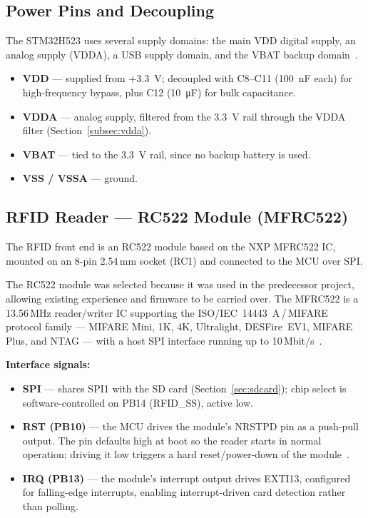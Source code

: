 \subsection{Power Pins and Decoupling}
\label{subsec:mcu-power}

The STM32H523 uses several supply domains: the main VDD digital supply, an analog supply
(VDDA), a USB supply domain, and the VBAT backup domain~\cite{ref1}.

\begin{itemize}
  \item \textbf{VDD} --- supplied from +\SI{3.3}{\volt}; decoupled with C8--C11
        (\SI{100}{\nano\farad} each) for high-frequency bypass, plus C12
        (\SI{10}{\micro\farad}) for bulk capacitance.
  \item \textbf{VDDA} --- analog supply, filtered from the \SI{3.3}{\volt} rail through
        the VDDA filter (Section~\ref{subsec:vdda}).
  \item \textbf{VBAT} --- tied to the \SI{3.3}{\volt} rail, since no backup battery is
        used.
  \item \textbf{VSS / VSSA} --- ground.
\end{itemize}

\subsection{RFID Reader --- RC522 Module (MFRC522)}
\label{subsec:rfid}

The RFID front end is an RC522 module based on the NXP MFRC522 IC, mounted on an 8-pin
2.54\,mm socket (RC1) and connected to the MCU over SPI.

The RC522 module was selected because it was used in the predecessor project, allowing
existing experience and firmware to be carried over. The MFRC522 is a 13.56\,MHz
reader/writer IC supporting the ISO/IEC~14443~A\,/\,MIFARE protocol family --- MIFARE
Mini, 1K, 4K, Ultralight, DESFire~EV1, MIFARE Plus, and NTAG --- with a host SPI
interface running up to 10\,Mbit/s~\cite{ref3}.

\textbf{Interface signals:}
\begin{itemize}
  \item \textbf{SPI} --- shares SPI1 with the SD card (Section~\ref{sec:sdcard}); chip
        select is software-controlled on PB14 (RFID\_SS), active low.
  \item \textbf{RST (PB10)} --- the MCU drives the module's NRSTPD pin as a push-pull
        output. The pin defaults high at boot so the reader starts in normal operation;
        driving it low triggers a hard reset/power-down of the module~\cite{ref3}.
  \item \textbf{IRQ (PB13)} --- the module's interrupt output drives EXTI13, configured
        for falling-edge interrupts, enabling interrupt-driven card detection rather than
        polling.
\end{itemize}

